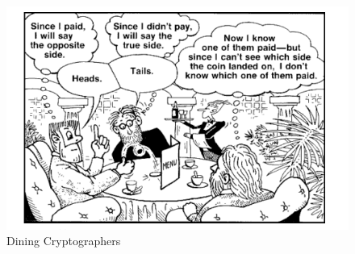 \begin{figure}
\centering
\includegraphics{res/dc.png}
\caption{Dining Cryptographers}\label{fig:dc}
\end{figure}